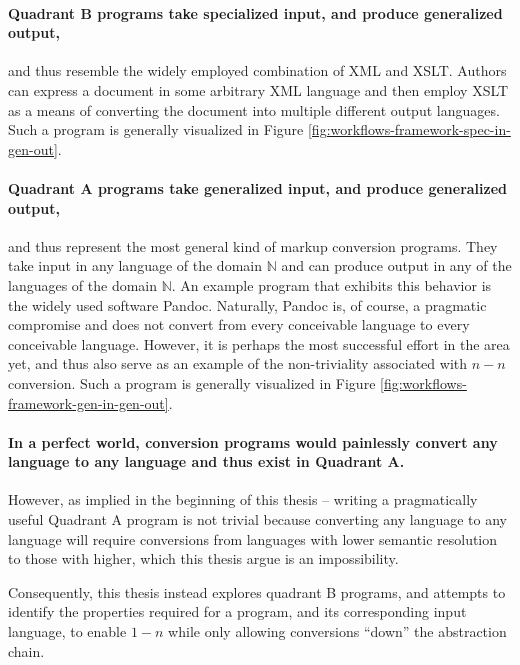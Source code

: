 \documentclass{scrreprt}
\begin{document}
\paragraph{Quadrant B programs take specialized input, and produce generalized output,}
and thus resemble the widely employed combination of XML and XSLT. Authors can express a document in some arbitrary XML language and then employ XSLT as a means of converting the document into multiple different output languages. Such a program is generally visualized in Figure \ref{fig:workflows-framework-spec-in-gen-out}.


\paragraph{Quadrant A programs take generalized input, and produce generalized output,}
and thus represent the most general kind of markup conversion programs. They take input in any language of the domain $\mathbb{N}$ and can produce output in any of the languages of the domain $\mathbb{N}$. An example program that exhibits this behavior is the widely used software Pandoc. Naturally, Pandoc is, of course, a pragmatic compromise and does not convert from every conceivable language to every conceivable language. However, it is perhaps the most successful effort in the area yet, and thus also serve as an example of the non-triviality associated with $n-n$ conversion. Such a program is generally visualized in Figure \ref{fig:workflows-framework-gen-in-gen-out}.



\paragraph{In a perfect world, conversion programs would painlessly convert any language to any language and thus exist in  Quadrant A.} However, as implied in the beginning of this thesis -- writing a pragmatically useful Quadrant A program is not trivial because converting any language to any language will require conversions from languages with lower semantic resolution to those with higher, which this thesis argue is an impossibility.

Consequently, this thesis instead explores quadrant B programs, and attempts to identify the properties required for a program, and its corresponding input language, to enable $1-n$ while only allowing conversions ``down'' the abstraction chain.


\end{document}
